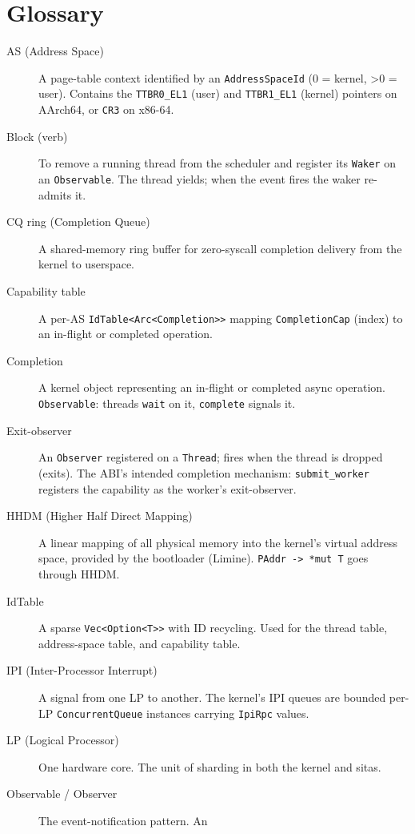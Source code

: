 \chapter{Glossary}

\begin{description}
    \item[AS (Address Space)] A page-table context identified by an
        \texttt{AddressSpaceId} (0 = kernel, >0 = user). Contains the
        \texttt{TTBR0\_EL1} (user) and \texttt{TTBR1\_EL1} (kernel) pointers
        on AArch64, or \texttt{CR3} on x86-64.
    \item[Block (verb)] To remove a running thread from the scheduler and
        register its \texttt{Waker} on an \texttt{Observable}. The thread
        yields; when the event fires the waker re-admits it.
    \item[CQ ring (Completion Queue)] A shared-memory ring buffer for
        zero-syscall completion delivery from the kernel to userspace.
    \item[Capability table] A per-AS \texttt{IdTable<Arc<Completion>>} mapping
        \texttt{CompletionCap} (index) to an in-flight or completed operation.
    \item[Completion] A kernel object representing an in-flight or completed
        async operation. \texttt{Observable}: threads \texttt{wait} on it,
        \texttt{complete} signals it.
    \item[Exit-observer] An \texttt{Observer} registered on a
        \texttt{Thread}; fires when the thread is dropped (exits). The ABI's
        intended completion mechanism: \texttt{submit\_worker} registers the
        capability as the worker's exit-observer.
    \item[HHDM (Higher Half Direct Mapping)] A linear mapping of all physical
        memory into the kernel's virtual address space, provided by the
        bootloader (Limine). \texttt{PAddr -> *mut T} goes through HHDM.
    \item[IdTable] A sparse \texttt{Vec<Option<T>>} with ID recycling. Used for
        the thread table, address-space table, and capability table.
    \item[IPI (Inter-Processor Interrupt)] A signal from one LP to another.
        The kernel's IPI queues are bounded per-LP \texttt{ConcurrentQueue}
        instances carrying \texttt{IpiRpc} values.
    \item[LP (Logical Processor)] One hardware core. The unit of sharding in
        both the kernel and sitas.
    \item[Observable / Observer] The event-notification pattern. An

\end{description}
